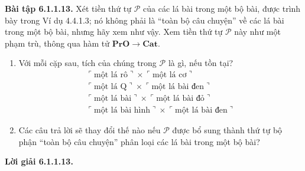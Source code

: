 \noindent\textbf{Bài tập 6.1.1.13.} Xét tiền thứ tự $\mathcal P$ của các lá bài trong một bộ bài, được trình bày trong Ví dụ 4.4.1.3; nó không phải là ``toàn bộ câu chuyện'' về các lá bài trong một bộ bài, nhưng hãy xem như vậy. Xem tiền thứ tự $\mathcal P$ này như một phạm trù, thông qua hàm tử $\mathbf{PrO}\to\mathbf{Cat}$.
\begin{enumerate}[label=\alph*.]
\item Với mỗi cặp sau, tích của chúng trong $\mathcal P$ là gì, nếu tồn tại?
\[\begin{gathered}
\ulcorner\text{một lá rô}\urcorner\times\ulcorner\text{một lá cơ}\urcorner\\
\ulcorner\text{một lá Q}\urcorner\times\ulcorner\text{một lá bài đen}\urcorner\\
\ulcorner\text{một lá bài}\urcorner\times\ulcorner\text{một lá bài đỏ}\urcorner\\
\ulcorner\text{một lá bài hình}\urcorner\times\ulcorner\text{một lá bài đen}\urcorner
\end{gathered}\]
\item Các câu trả lời sẽ thay đổi thế nào nếu $\mathcal P$ được bổ sung thành thứ tự bộ phận ``toàn bộ câu chuyện'' phân loại các lá bài trong một bộ bài?
\end{enumerate}
\noindent\textbf{Lời giải 6.1.1.13.}\keepwithnext
